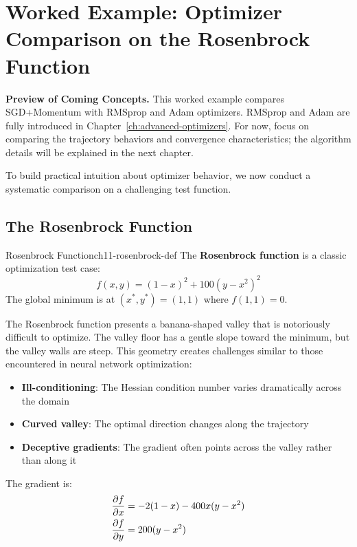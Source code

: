 \documentclass[../../main.tex]{subfiles}
\begin{document}
\section{Worked Example: Optimizer Comparison on the Rosenbrock Function}
\label{sec:ch11-optimizer-showdown}

\begin{important}
\textbf{Preview of Coming Concepts.} This worked example compares SGD+Momentum with RMSprop and Adam optimizers. RMSprop and Adam are fully introduced in Chapter~\ref{ch:advanced-optimizers}. For now, focus on comparing the trajectory behaviors and convergence characteristics; the algorithm details will be explained in the next chapter.
\end{important}

To build practical intuition about optimizer behavior, we now conduct a systematic comparison on a challenging test function.

\subsection{The Rosenbrock Function}

\begin{definition}{Rosenbrock Function}{ch11-rosenbrock-def}
The \textbf{Rosenbrock function} is a classic optimization test case:
\[
    f(x, y) = (1 - x)^2 + 100(y - x^2)^2
\]
The global minimum is at $(x^*, y^*) = (1, 1)$ where $f(1, 1) = 0$.
\end{definition}

The Rosenbrock function presents a banana-shaped valley that is notoriously difficult to optimize. The valley floor has a gentle slope toward the minimum, but the valley walls are steep. This geometry creates challenges similar to those encountered in neural network optimization:

\begin{itemize}
    \item \textbf{Ill-conditioning}: The Hessian condition number varies dramatically across the domain
    \item \textbf{Curved valley}: The optimal direction changes along the trajectory
    \item \textbf{Deceptive gradients}: The gradient often points across the valley rather than along it
\end{itemize}

The gradient is:
\begin{align}
    \frac{\partial f}{\partial x} &= -2(1-x) - 400x(y - x^2) \\
    \frac{\partial f}{\partial y} &= 200(y - x^2)
\end{align}
\end{document}

